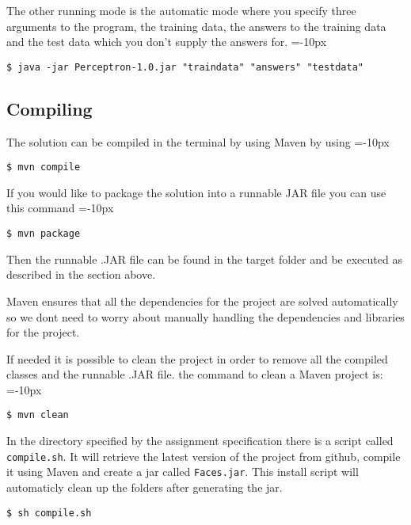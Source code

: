 \documentclass[a4paper, 12pt]{article}
\begin{document}
The other running mode is the automatic mode where you specify three arguments to the program, the training data, the answers to the training data and the test data which you don't supply the answers for.
\belowcaptionskip=-10px
\begin{lstlisting}[label=cd-example, caption=Launch in Automatic mode]
$ java -jar Perceptron-1.0.jar "traindata" "answers" "testdata"
\end{lstlisting}

\subsection{Compiling}
The solution can be compiled in the terminal by using Maven by using
\belowcaptionskip=-10px
\begin{lstlisting}[label=cd-example, caption=Maven Compile]
$ mvn compile
\end{lstlisting}



If you would like to package the solution into a runnable JAR file you can use this command
\belowcaptionskip=-10px
\begin{lstlisting}[label=cd-example, caption=Maven Package]
$ mvn package
\end{lstlisting}
Then the runnable .JAR file can be found in the target folder and be executed as described in the section above.

Maven ensures that all the dependencies for the project are solved automatically so we dont need to worry about manually handling the dependencies and libraries for the project.

If needed it is possible to clean the project in order to remove all the compiled classes and the runnable .JAR file. the command to clean a Maven project is:
\belowcaptionskip=-10px
\begin{lstlisting}[label=cd-example, caption=Maven Clean]
$ mvn clean
\end{lstlisting}

In the directory specified by the assignment specification there is a script
called \verb|compile.sh|. It will retrieve the latest version of the project
from github, compile it using Maven and create a jar called \verb|Faces.jar|.
 This install script will automaticly clean up the folders after generating
 the jar.

 \begin{lstlisting}[label=cd-example, caption=Compiler Script]
 $ sh compile.sh
 \end{lstlisting}
\end{document}
